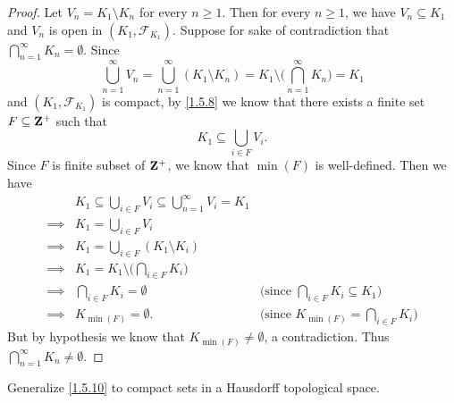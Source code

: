 \begin{proof}
  Let \(V_n = K_1 \setminus K_n\) for every \(n \geq 1\).
  Then for every \(n \geq 1\), we have \(V_n \subseteq K_1\) and \(V_n\) is open in \((K_1, \mathcal{F}_{K_1})\).
  Suppose for sake of contradiction that \(\bigcap_{n = 1}^\infty K_n = \emptyset\).
  Since
  \[
    \bigcup_{n = 1}^\infty V_n = \bigcup_{n = 1}^\infty (K_1 \setminus K_n) = K_1 \setminus \bigg(\bigcap_{n = 1}^\infty K_n\bigg) = K_1
  \]
  and \((K_1, \mathcal{F}_{K_1})\) is compact, by \cref{1.5.8} we know that there exists a finite set \(F \subseteq \mathbf{Z}^+\) such that
  \[
    K_1 \subseteq \bigcup_{i \in F} V_i.
  \]
  Since \(F\) is finite subset of \(\mathbf{Z}^+\), we know that \(\min(F)\) is well-defined.
  Then we have
  \begin{align*}
             & K_1 \subseteq \bigcup_{i \in F} V_i \subseteq \bigcup_{n = 1}^\infty V_i = K_1                                                          \\
    \implies & K_1 = \bigcup_{i \in F} V_i                                                                                                             \\
    \implies & K_1 = \bigcup_{i \in F} (K_1 \setminus K_i)                                                                                             \\
    \implies & K_1 = K_1 \setminus \bigg(\bigcap_{i \in F} K_i\bigg)                                                                                   \\
    \implies & \bigcap_{i \in F} K_i = \emptyset                                              & \text{(since \(\bigcap_{i \in F} K_i \subseteq K_1)\)} \\
    \implies & K_{\min(F)} = \emptyset.                                                       & \text{(since \(K_{\min(F)} = \bigcap_{i \in F} K_i)\)}
  \end{align*}
  But by hypothesis we know that \(K_{\min(F)} \neq \emptyset\), a contradiction.
  Thus \(\bigcap_{n = 1}^\infty K_n \neq \emptyset\).
\end{proof}

\begin{exercise}\label{ex 2.5.14}
  Generalize \cref{1.5.10} to compact sets in a Hausdorff topological space.
\end{exercise}

